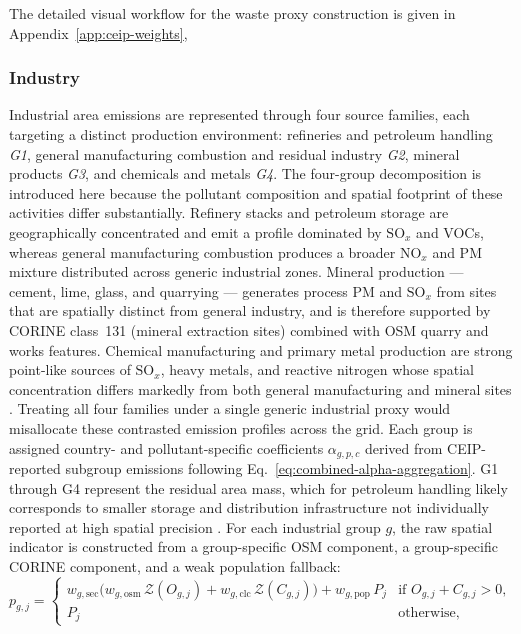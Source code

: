 The detailed visual workflow for the waste proxy construction is given
in Appendix~\ref{app:ceip-weights}, 
\subsubsection{Industry}
\label{sec:combined-industry}
Industrial area emissions are represented through four source families, each targeting
a distinct production environment: refineries and petroleum handling \textit{G1}, general
manufacturing combustion and residual industry \textit{G2}, mineral products \textit{G3}, and
chemicals and metals \textit{G4}.  The four-group decomposition is introduced here because the pollutant
composition and spatial footprint of these activities differ substantially. Refinery
stacks and petroleum storage are geographically concentrated and emit a profile
dominated by $\text{SO}_x$ and VOCs, whereas general manufacturing combustion produces a
broader $\text{NO}_x$ and PM mixture distributed across generic industrial zones. Mineral
production --- cement, lime, glass, and quarrying --- generates process PM and $\text{SO}_x$
from sites that are spatially distinct from general industry, and is therefore supported
by CORINE class~131 (mineral extraction sites) combined with OSM quarry and works
features. Chemical manufacturing and primary metal production are strong point-like
sources of $\text{SO}_x$, heavy metals, and reactive nitrogen whose spatial concentration
differs markedly from both general manufacturing and mineral sites
\citep{EMEP_EEA, CAMS-REG-v4}. Treating all four families under a single generic
industrial proxy would misallocate these contrasted emission profiles across the grid.
Each group is assigned country- and pollutant-specific coefficients
$\alpha_{g,p,c}$ derived from CEIP-reported subgroup emissions following
Eq.~\ref{eq:combined-alpha-aggregation}. G1 through G4 represent the residual
area mass, which for petroleum handling likely corresponds to smaller storage and
distribution infrastructure not individually reported at high spatial precision
\citep{Crippa2016, CAMS-REG-v4}.
For each industrial group $g$, the raw spatial indicator is constructed from a
group-specific OSM component, a group-specific CORINE component, and a weak population
fallback:
%
\begin{equation}
  p_{g,j} =
  \begin{cases}
    w_{g,\mathrm{sec}}
    \bigl(
      w_{g,\mathrm{osm}}\, \mathcal{Z}(O_{g,j})
      + w_{g,\mathrm{clc}}\, \mathcal{Z}(C_{g,j})
    \bigr)
    + w_{g,\mathrm{pop}}\, P_j
    & \text{if } O_{g,j} + C_{g,j} > 0, \\[6pt]
    P_j
    & \text{otherwise,}
  \end{cases}
  \label{eq:industry-group-proxy}
\end{equation}
